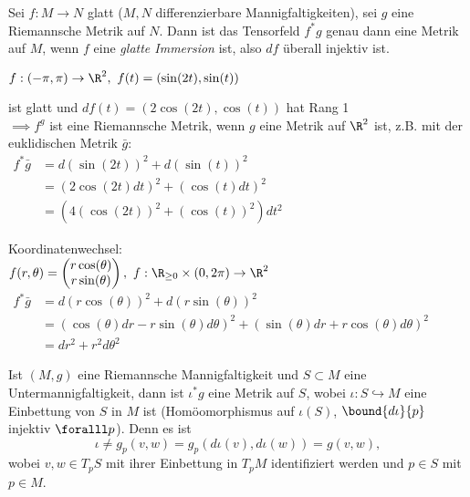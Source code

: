 \lecture\begin{lem} 
	Sei $ f: M \to N $ glatt ($M,N$ differenzierbare Mannigfaltigkeiten), sei $g$ eine Riemannsche Metrik auf $N$. Dann ist das Tensorfeld $ f^*g $ genau dann eine Metrik auf $M$, wenn $f$ eine \emph{glatte Immersion} ist, also $df$ überall injektiv ist.
\end{lem}

\begin{exmp*}
	$ f:(-\pi,\pi)\to \R^2,\ f(t) = (\sin(2t),\sin(t)) $\\
	\begin{minipage}{\linewidth}
		\begin{wrapfigure}{l}{0.1\textwidth}
		\end{wrapfigure}
		ist glatt und $ df(t) = (2\cos(2t),\cos(t)) $ hat Rang 1\\
		$\implies f^g$ ist eine Riemannsche Metrik, wenn $g$ eine Metrik auf $\R^2$ ist, z.B. mit der euklidischen Metrik $\bar{g}$:\\
		$\begin{aligned}
			f^*\bar{g} &= d(\sin(2t))^2 + d(\sin(t))^2\\
			&= (2\cos(2t)dt)^2 + (\cos(t)dt)^2\\
			&= (4(\cos(2t))^2 + (\cos(t))^2)dt^2
		\end{aligned}$
	\end{minipage}
\end{exmp*}

\begin{exmp*}
	Koordinatenwechsel:\\
	$ f(r,\theta) = \begin{pmatrix}
		r\cos(\theta)\\r\sin(\theta)
	\end{pmatrix} ,\ f: \R_{\geq 0} \times (0,2\pi) \to \R^2$\\
	$ \begin{aligned}
		f^*\bar{g} &= d(r\cos(\theta))^2 + d(r\sin(\theta))^2\\
		&= (\cos(\theta)dr - r\sin(\theta)d\theta)^2 + (\sin(\theta)dr + r\cos(\theta)d\theta)^2\\
		&= dr^2 + r^2d\theta^2
	\end{aligned} $
\end{exmp*}

\begin{defn*}
	Ist $ (M,g) $ eine Riemannsche Mannigfaltigkeit und $S \subset M$ eine Untermannigfaltigkeit, dann ist $\iota^*g$ eine Metrik auf $S$, wobei $\iota: S \hookrightarrow M$ eine Einbettung von $S$ in $M$ ist (Homöomorphismus auf $\iota(S)$, $\bound{d\iota}{p}$ injektiv $\foralll p$). Denn es ist
	\[ \iota \neq g_p(v,w) = g_p(d\iota(v),d\iota(w)) = g(v,w), \]
	wobei $v,w \in T_pS$ mit ihrer Einbettung in $T_pM$ identifiziert werden und $p \in S$ mit $p \in M$.
\end{defn*}


